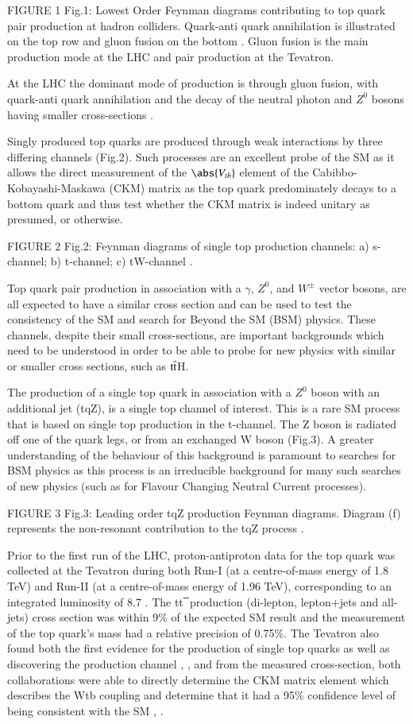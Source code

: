 FIGURE 1
Fig.1: Lowest Order Feynman diagrams contributing to top quark pair production at hadron colliders. Quark-anti quark annihilation is illustrated on the top row and gluon fusion on the bottom . Gluon fusion is the main production mode at the LHC and pair production at the Tevatron.

At the LHC the dominant mode of production is through gluon fusion, with quark-anti quark annihilation and the decay of the neutral photon and $Z^{0}$ bosons having smaller cross-sections .

Singly produced top quarks are produced through weak interactions by three differing channels (Fig.2).
Such processes are an excellent probe of the SM as it allows the direct measurement of the $\abs{V_{tb}}$ element of the Cabibbo-Kobayashi-Maskawa (CKM) matrix as the top quark predominately decays to a bottom quark and thus test whether the CKM matrix is indeed unitary as presumed, or otherwise.

FIGURE 2
Fig.2: Feynman diagrams of single top production channels: a) s-channel; b) t-channel; c) tW-channel .

Top quark pair production in association with a $\gamma$, $Z^{0}$, and $W^{\pm}$ vector bosons, are all expected to have a similar cross section and can be used to test the consistency of the SM and search for Beyond the SM (BSM) physics.
These channels, despite their small cross-sections, are important backgrounds which need to be understood in order to be able to probe for new physics with similar or smaller cross sections, such as $\mathrm{t}\overline{\mathrm{t}}$H.

The production of a single top quark in association with a $Z^{0}$ boson with an additional jet (tqZ), is a single top channel of interest.
This is a rare SM process that is based on single top production in the t-channel. The Z boson is radiated off one of the quark legs, or from an exchanged W boson (Fig.3).
A greater understanding of the behaviour of this background is paramount to searches for BSM physics as this process is an irreducible background for many such searches of new physics (such as for Flavour Changing Neutral Current processes). 

FIGURE 3
Fig.3: Leading order tqZ production Feynman diagrams. Diagram (f) represents the non-resonant contribution to the tqZ process .

Prior to the first run of the LHC, proton-antiproton data for the top quark was collected at the Tevatron during both Run-I (at a centre-of-mass energy of 1.8 TeV) and Run-II (at a centre-of-mass energy of 1.96 TeV), corresponding to an integrated luminosity of 8.7 \fbinv.
The tt ̅ production (di-lepton, lepton+jets and all-jets) cross section was within 9\% of the expected SM result  and the measurement of the top quark’s mass had a relative precision of 0.75\%.
The Tevatron also found both the first evidence for the production of single top quarks  as well as discovering the production channel , , and from the measured cross-section, both collaborations were able to directly determine the CKM matrix element which describes the Wtb coupling and determine that it had a 95\% confidence level of being consistent with the SM , .

